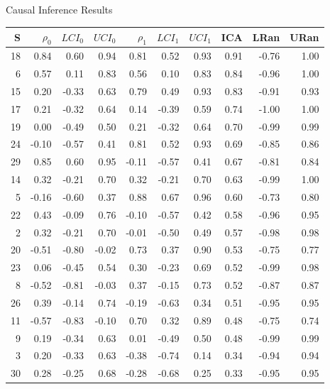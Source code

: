 \documentclass[a4paper,9pt]{beamer}\usepackage[]{graphicx}\usepackage[]{color}
\begin{document}
\begin{frame}{Causal Inference Results}
\tiny

\begin{table}[ht]
\centering
\begin{tabular}{rrrrrrrrrr}
  \hline
S & $\rho_0$ & $LCI_0$ & $UCI_0$ & $\rho_1$ & $LCI_1$ & $UCI_1$ & ICA & LRan & URan \\ 
  \hline
 \alert{18} & 0.84 & 0.60 & 0.94 & 0.81 & 0.52 & 0.93 & 0.91 & -0.76 & 1.00 \\ 
    \alert{6} & 0.57 & 0.11 & 0.83 & 0.56 & 0.10 & 0.83 & 0.84 & -0.96 & 1.00 \\ 
   \alert{15} & 0.20 & -0.33 & 0.63 & 0.79 & 0.49 & 0.93 & 0.83 & -0.91 & 0.93 \\ 
   \alert{17} & 0.21 & -0.32 & 0.64 & 0.14 & -0.39 & 0.59 & 0.74 & -1.00 & 1.00 \\ 
   \alert{19} & 0.00 & -0.49 & 0.50 & 0.21 & -0.32 & 0.64 & 0.70 & -0.99 & 0.99 \\ 
   \alert{24} & -0.10 & -0.57 & 0.41 & 0.81 & 0.52 & 0.93 & 0.69 & -0.85 & 0.86 \\ 
   \alert{29} & 0.85 & 0.60 & 0.95 & -0.11 & -0.57 & 0.41 & 0.67 & -0.81 & 0.84 \\ 
   \alert{14} & 0.32 & -0.21 & 0.70 & 0.32 & -0.21 & 0.70 & 0.63 & -0.99 & 1.00 \\ 
    \alert{5} & -0.16 & -0.60 & 0.37 & 0.88 & 0.67 & 0.96 & 0.60 & -0.73 & 0.80 \\ 
   \alert{22} & 0.43 & -0.09 & 0.76 & -0.10 & -0.57 & 0.42 & 0.58 & -0.96 & 0.95 \\ 
    2 & 0.32 & -0.21 & 0.70 & -0.01 & -0.50 & 0.49 & 0.57 & -0.98 & 0.98 \\ 
   20 & -0.51 & -0.80 & -0.02 & 0.73 & 0.37 & 0.90 & 0.53 & -0.75 & 0.77 \\ 
   23 & 0.06 & -0.45 & 0.54 & 0.30 & -0.23 & 0.69 & 0.52 & -0.99 & 0.98 \\ 
    8 & -0.52 & -0.81 & -0.03 & 0.37 & -0.15 & 0.73 & 0.52 & -0.87 & 0.87 \\ 
   26 & 0.39 & -0.14 & 0.74 & -0.19 & -0.63 & 0.34 & 0.51 & -0.95 & 0.95 \\ 
   11 & -0.57 & -0.83 & -0.10 & 0.70 & 0.32 & 0.89 & 0.48 & -0.75 & 0.74 \\ 
    9 & 0.19 & -0.34 & 0.63 & 0.01 & -0.49 & 0.50 & 0.48 & -0.99 & 0.99 \\ 
    3 & 0.20 & -0.33 & 0.63 & -0.38 & -0.74 & 0.14 & 0.34 & -0.94 & 0.94 \\ 
   30 & 0.28 & -0.25 & 0.68 & -0.28 & -0.68 & 0.25 & 0.33 & -0.95 & 0.95 \\ 

\end{tabular}
\end{table}
\end{frame}
\end{document}
